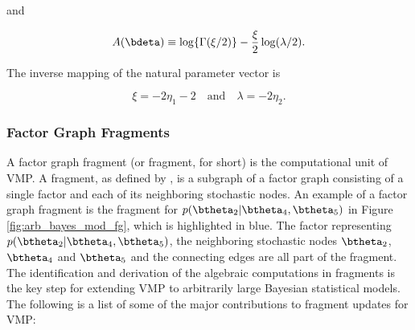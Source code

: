 \documentclass[12pt]{article}
\theoremstyle{plain}
\theoremstyle{definition}
\theoremstyle{remark}
\begin{document}
\noindent and

\[
	A(\bdeta) \equiv \log \{ \Gamma (\xi/2) \} - \frac{\xi}{2} \log (\lambda/2).
\]

\noindent The inverse mapping of the natural parameter vector is \cite[equation~8]{maestrini20}

\[
	\xi = -2 \eta_1 - 2 \quad
	\text{and} \quad
	\lambda = -2 \eta_2.
\]


\subsubsection{Factor Graph Fragments}
\label{sec:fg_frag}

A factor graph fragment (or fragment, for short) is the computational unit of VMP.
A fragment, as defined by ,
is a subgraph of a factor graph
consisting of a single factor and each of its neighboring stochastic nodes.
An example of a factor graph fragment is the fragment for $p (\btheta_2 | \btheta_4, \btheta_5)$ in Figure
\ref{fig:arb_bayes_mod_fg}, which is highlighted in blue. The factor representing $p (\btheta_2 | \btheta_4, \btheta_5)$,
the neighboring stochastic nodes $\btheta_2$, $\btheta_4$ and $\btheta_5$ and the connecting edges are all
part of the fragment.
The identification and derivation of
the algebraic computations in fragments is the key step for extending VMP to arbitrarily large Bayesian statistical
models. The following is a list of some of the major contributions to fragment updates for VMP:
\end{document}
